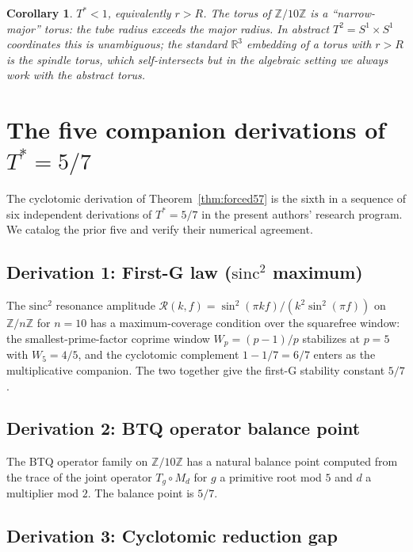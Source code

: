 \documentclass[11pt,reqno]{amsart}
\theoremstyle{plain}
\newtheorem{corollary}[theorem]{Corollary}
\theoremstyle{definition}
\newcommand{\Z}{\mathbb{Z}}
\newcommand{\Zts}{\Z/10\Z}
\newcommand{\Tstar}{T^{*}}
\newcommand{\sinc}{\mathrm{sinc}}
\begin{document}
\begin{corollary} \label{cor:R-less-r}
$\Tstar < 1$, equivalently $r > R$. The torus of $\Zts$ is a ``narrow-major'' torus: the tube radius exceeds the major radius. In abstract $T^2 = S^1 \times S^1$ coordinates this is unambiguous; the standard $\mathbb{R}^3$ embedding of a torus with $r > R$ is the spindle torus, which self-intersects but in the algebraic setting we always work with the abstract torus.
\end{corollary}

\section{The five companion derivations of $\Tstar = 5/7$} \label{sec:companions}

The cyclotomic derivation of Theorem~\ref{thm:forced57} is the sixth in a sequence of six independent derivations of $\Tstar = 5/7$ in the present authors' research program. We catalog the prior five and verify their numerical agreement.

\subsection{Derivation 1: First-G law ($\sinc^2$ maximum)}

The $\sinc^2$ resonance amplitude $\mathcal{R}(k,f) = \sin^2(\pi k f)/(k^2 \sin^2(\pi f))$ on $\Z/n\Z$ for $n = 10$ has a maximum-coverage condition over the squarefree window: the smallest-prime-factor coprime window $W_p = (p-1)/p$ stabilizes at $p = 5$ with $W_5 = 4/5$, and the cyclotomic complement $1 - 1/7 = 6/7$ enters as the multiplicative companion. The two together give the first-G stability constant $5/7$. \cite{SandersGish-FirstG}

\subsection{Derivation 2: BTQ operator balance point}

The BTQ operator family on $\Zts$ has a natural balance point computed from the trace of the joint operator $T_g \circ M_d$ for $g$ a primitive root mod $5$ and $d$ a multiplier mod $2$. The balance point is $5/7$.

\subsection{Derivation 3: Cyclotomic reduction gap}
\end{document}
